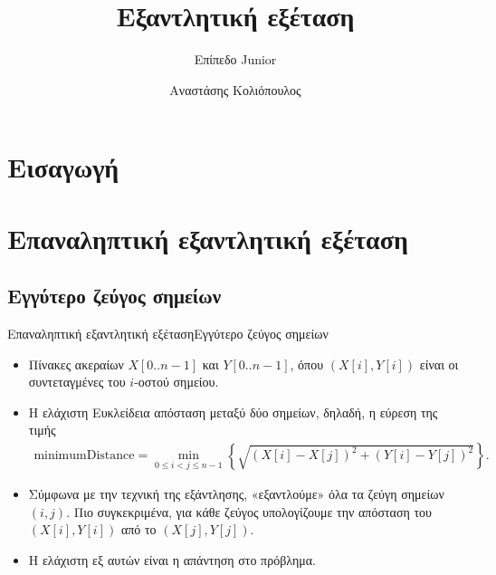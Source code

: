\documentclass[t,aspectratio=169,9pt]{beamer}
\title{Εξαντλητική εξέταση}
\subtitle{Επίπεδο Junior}
\author{Αναστάσης Κολιόπουλος}
\date{}
\begin{document}
\pdptitleframe                 %

\section{Εισαγωγή}        %

\section{Επαναληπτική εξαντλητική εξέταση}

\subsection{Εγγύτερο ζεύγος σημείων}
\begin{frame}{Επαναληπτική εξαντλητική εξέταση}{Εγγύτερο ζεύγος σημείων}
\begin{itemize}
    \pause
    \item Πίνακες ακεραίων $X[0..n-1]$ και $Y[0..n-1]$, όπου $(X[i], Y[i])$ είναι οι συντεταγμένες
    του $i$-οστού σημείου.
\end{itemize}
\pause
{}
\begin{itemize}
    \pause
    \item Η ελάχιστη Ευκλείδεια απόσταση μεταξύ δύο σημείων, δηλαδή, η εύρεση της τιμής
    \begin{align*}
        \text{minimumDistance} = \min_{0 \leq i < j \leq n-1}
        \left\{ \sqrt{(X[i] - X[j])^{2} + (Y[i] - Y[j])^{2}} \right\}.
    \end{align*}
\end{itemize}
    \pause
    \begin{itemize}
        \pause 
        \item Σύμφωνα με την τεχνική της εξάντλησης, «εξαντλούμε» όλα τα ζεύγη σημείων $(i, j)$. Πιο συγκεκριμένα, για κάθε ζεύγος
        υπολογίζουμε την απόσταση του $(X[i], Y[i])$ από το $(X[j], Y[j])$.
        \pause 
        \item Η ελάχιστη εξ αυτών είναι η απάντηση στο πρόβλημα.
    \end{itemize}
\end{frame}
\end{document}
